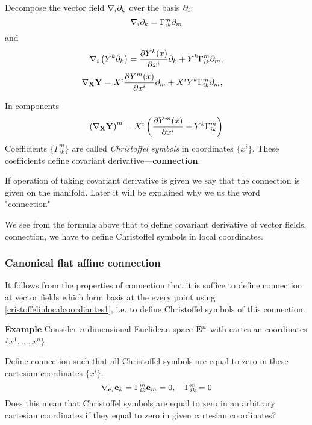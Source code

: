 \documentclass[12pt]{article}
\theoremstyle{theorem}
\numberwithin{equation}{section}
\begin{document}
 Decompose the vector field  $\nabla_i \partial_k$ over the basis $\partial_i$:
             \begin{equation}\label{cristoffelinlocalcoordiantes1}
                \nabla_i \partial_k=\Gamma_{ik}^m\partial_m
              \end{equation}
             and
\begin{equation}\label{covariantderivative}
    \nabla_i\left({Y^k \partial_k}\right)=
    {\partial Y^k(x)\over \partial x^i}{\partial}_k+Y^k\Gamma_{ik}^m\partial_m,
\end{equation}
   \begin{equation}\label{covariantderivative2}
    \nabla_{\bf X} {\bf Y}=
    X^i{\partial Y^m(x)\over \partial x^i}\partial_m+X^iY^k\Gamma_{ik}^m\partial_m,\quad
    \end{equation}

    In components
           \begin{equation}\label{covderivincomponents}
             \left( \nabla_{\bf X} {\bf Y}\right)^m=
    X^i\left({\partial Y^m(x)\over \partial x^i}+Y^k\Gamma_{ik}^m\right)
           \end{equation}
    Coefficients $\{\Gamma_{ik}^m\}$ are called {\it Christoffel symbols} in coordinates $\{x^i\}$.
These coefficients define covariant derivative---{\bf connection}.


If operation of taking covariant derivative is given we say that the connection is given on the manifold.
Later it will be explained why we us the word "connection"


We see from the formula above that to define covariant derivative of vector fields, connection,
we have to define Christoffel symbols in local coordinates.


\medskip

\subsubsection {Canonical flat affine connection }

  It follows from the properties of connection that it is suffice
   to define connection at vector fields which form basis at the every point
   using \eqref{cristoffelinlocalcoordiantes1}, i.e. to define Christoffel symbols of this connection.

   {\bf Example} Consider $n$-dimensional Euclidean space ${\bf E}^n$ with cartesian coordinates
   $\{x^1,\dots,x^n\}$.

   Define connection such that all Christoffel symbols
    are equal to zero in these cartesian coordinates $\{x^i\}$.
\begin{equation}\label{flatconnection1}
  \nabla_{{\bf e}_i}{\bf e}_k=\Gamma_{ik}^m{\bf e}_m=0,\quad   \Gamma_{ik}^m=0
\end{equation}
Does  this mean that Christoffel symbols are equal to zero in
an arbitrary cartesian coordinates if they equal to zero in given cartesian coordinates?
\end{document}
